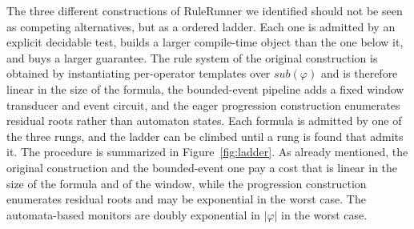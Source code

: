 
The three different constructions of RuleRunner we identified should not be seen as competing alternatives, but as a ordered ladder. Each one is admitted by an explicit decidable test, builds a larger compile-time object than the one below it, and buys a larger guarantee. The rule system of the original construction is obtained by instantiating per-operator templates over $sub(\varphi)$ and is therefore linear in the size of the formula, the bounded-event pipeline adds a fixed window transducer and event circuit, and the eager progression construction enumerates residual roots rather than automaton states. Each \ltlf formula is admitted by one of the three rungs, and the ladder can be climbed until a rung is found that admits it. The procedure is summarized in Figure~\ref{fig:ladder}.
%
As already mentioned, the original construction and the bounded-event one pay a cost that is linear in the size of the formula and of the window, while the progression construction enumerates residual roots and may be exponential in the worst case. The automata-based monitors are doubly exponential in $|\varphi|$ in the worst case.

